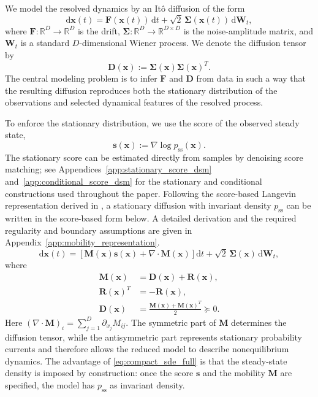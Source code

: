 \documentclass[11pt,twoside,fleqn]{article}
\renewcommand{\d}{\mathrm{d}}
\begin{document}
We model the resolved dynamics by an It\^o diffusion of the form
\begin{equation}
    \d \bm{x}(t)
    =
    \bm{F}(\bm{x}(t))\,\d t
    +
    \sqrt{2}\,\bm{\Sigma}(\bm{x}(t))\,\d \bm{W}_t,
    \label{eq:method_sde_full}
\end{equation}
where $\bm{F}:\mathbb{R}^D\to\mathbb{R}^D$ is the drift,
$\bm{\Sigma}:\mathbb{R}^D\to\mathbb{R}^{D\times D}$ is the noise-amplitude matrix, and $\bm{W}_t$ is a standard $D$-dimensional Wiener process. We denote the diffusion tensor by
\begin{equation}
    \bm{D}(\bm{x})
    :=
    \bm{\Sigma}(\bm{x})\bm{\Sigma}(\bm{x})^T .
    \label{eq:diffusion_tensor_definition}
\end{equation}
The central modeling problem is to infer $\bm{F}$ and $\bm{D}$ from data in such a way that the resulting diffusion reproduces both the stationary distribution of the observations and selected dynamical features of the resolved process.

To enforce the stationary distribution, we use the score of the observed steady state,
\begin{equation}
    \bm{s}(\bm{x})
    :=
    \nabla \log p_{\mathrm{ss}}(\bm{x}).
    \label{eq:score_definition_method}
\end{equation}
The stationary score can be estimated directly from samples by denoising score matching; see Appendices~\ref{app:stationary_score_dsm} and~\ref{app:conditional_score_dsm} for the stationary and conditional constructions used throughout the paper.
Following the score-based Langevin representation derived in \cite{giorgini2026scorelangevin}, a stationary diffusion with invariant density $p_{\mathrm{ss}}$ can be written in the score-based form below. A detailed derivation and the required regularity and boundary assumptions are given in Appendix~\ref{app:mobility_representation}.
\begin{equation}
    \d \bm{x}(t)
    =
    \left[
        \bm{M}(\bm{x})\bm{s}(\bm{x})
        +
        \nabla\cdot\bm{M}(\bm{x})
    \right]\d t
    +
    \sqrt{2}\,\bm{\Sigma}(\bm{x})\,\d \bm{W}_t,
    \label{eq:compact_sde_full}
\end{equation}
where
\begin{equation}
\begin{aligned}
    \bm{M}(\bm{x})
    &=
    \bm{D}(\bm{x})
    +
    \bm{R}(\bm{x}),
    \\
    \bm{R}(\bm{x})^T
    &=
    -\bm{R}(\bm{x}),
    \\
    \bm{D}(\bm{x})
    &=
    \frac{\bm{M}(\bm{x})+\bm{M}(\bm{x})^T}{2}
    \succeq 0 .
\end{aligned}
    \label{eq:mobility_decomposition_method}
\end{equation}
Here $(\nabla\cdot\bm{M})_i=\sum_{j=1}^D\partial_{x_j}M_{ij}$. The symmetric part of $\bm{M}$ determines the diffusion tensor, while the antisymmetric part represents stationary probability currents and therefore allows the reduced model to describe nonequilibrium dynamics. The advantage of \eqref{eq:compact_sde_full} is that the steady-state density is imposed by construction: once the score $\bm{s}$ and the mobility $\bm{M}$ are specified, the model has $p_{\mathrm{ss}}$ as invariant density.
\end{document}
